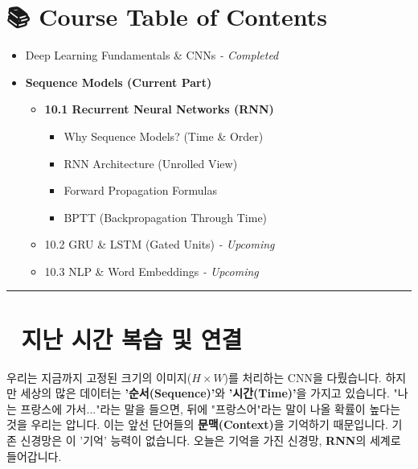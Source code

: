 \documentclass[11pt,a4paper]{book}
\theoremstyle{definition}
\begin{document}
\section*{📚 Course Table of Contents}
\begin{itemize}
    \item[Chapter 1-9.] Deep Learning Fundamentals \& CNNs \textit{- Completed}
    \item[\textbf{Chapter 10.}] \textbf{Sequence Models (Current Part)}
    \begin{itemize}
        \item \textbf{10.1 Recurrent Neural Networks (RNN)}
        \begin{itemize}
            \item Why Sequence Models? (Time \& Order)
            \item RNN Architecture (Unrolled View)
            \item Forward Propagation Formulas
            \item BPTT (Backpropagation Through Time)
        \end{itemize}
        \item 10.2 GRU \& LSTM (Gated Units) \textit{- Upcoming}
        \item 10.3 NLP \& Word Embeddings \textit{- Upcoming}
    \end{itemize}
\end{itemize}

\vspace{0.5cm}
\hrule
\vspace{0.5cm}

\section*{🔗 지난 시간 복습 및 연결}
우리는 지금까지 고정된 크기의 이미지($H \times W$)를 처리하는 CNN을 다뤘습니다. 하지만 세상의 많은 데이터는 \textbf{'순서(Sequence)'}와 \textbf{'시간(Time)'}을 가지고 있습니다.
"나는 프랑스에 가서..."라는 말을 들으면, 뒤에 "프랑스어"라는 말이 나올 확률이 높다는 것을 우리는 압니다. 이는 앞선 단어들의 \textbf{문맥(Context)}을 기억하기 때문입니다.
기존 신경망은 이 '기억' 능력이 없습니다. 오늘은 기억을 가진 신경망, \textbf{RNN}의 세계로 들어갑니다.

\end{document}
